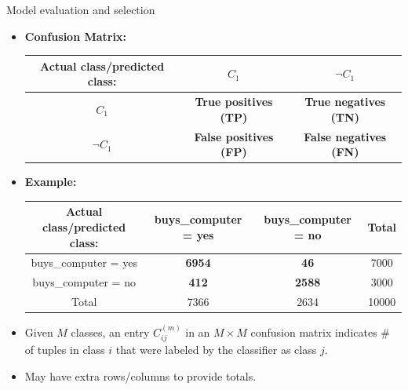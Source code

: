 \documentclass[aspectratio=169,t,table]{beamer}
\begin{document}
  {
    \begin{frame}{Model evaluation and selection}
        \begin{itemize}
          \item \textbf{Confusion Matrix:}\\[0.2cm]
          \begin{tabular}{|c|c|c|}
            \hline
            Actual class/predicted class: & $C_1$ & $\neg C_1$ \\\hline
            $C_1$ & \textbf{True positives (TP)} & \textbf{True negatives (TN)} \\\hline
            $\neg C_1$ & \textbf{False positives (FP)} & \textbf{False negatives (FN)} \\\hline
          \end{tabular}
          \item \textbf{Example:}\\[0.2cm]
          \begin{tabular}{|c|c|c|c|}
            \hline
            Actual class/predicted class: & buys\_computer = yes & buys\_computer = no & Total \\\hline
            buys\_computer = yes & \textbf{6954} & \textbf{46} & 7000 \\\hline
            buys\_computer = no & \textbf{412} & \textbf{2588} & 3000 \\\hline
            Total & 7366 & 2634 & 10000 \\\hline
          \end{tabular}
          \item Given $M$ classes, an entry $C^{(m)}_{ij}$ in an $M \times M$ confusion matrix indicates \# of tuples in class $i$ that were labeled by the classifier as class $j$.
          \item May have extra rows/columns to provide totals.
      \end{itemize}
    \end{frame}
  }
\end{document}
